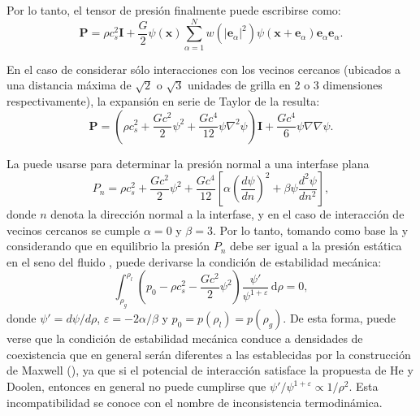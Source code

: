 Por lo tanto, el tensor de presi\'on finalmente puede escribirse como:
\begin{equation}
	\bm{P} = \rho c_s^2 \bm{I} + \dfrac{G}{2}\psi(\bm{x}) \sum_{\alpha=1}^N w(|\bm{e}_{\alpha}|^2)\psi(\bm{x}+\bm{e}_{\alpha})\bm{e}_{\alpha}\bm{e}_{\alpha}.
	\label{eq:ptens_shan}
\end{equation}

En el caso de considerar s\'olo interacciones con los vecinos cercanos (ubicados a una distancia m\'axima de $\sqrt{2}$ o $\sqrt{3}$ unidades de grilla en 2 o 3 dimensiones respectivamente), la expansi\'on en serie de Taylor de la  resulta:
\begin{equation}
	\bm{P} = \left( \rho c_s^2 + \dfrac{G c^2}{2} \psi^2 + \dfrac{G c^4}{12} \psi \nabla^2 \psi \right) \bm{I} + \dfrac{G c^4}{6} \psi \nabla \nabla \psi.
	\label{eq:ptens_shan_taylor}	
\end{equation}

La  puede usarse para determinar la presi\'on normal a una interfase plana
\begin{equation}
	P_n = \rho c_s^2 + \dfrac{G c^2}{2} \psi^2 + \dfrac{G c^4}{12} \left[ \alpha \left( \dfrac{d\psi}{dn} \right)^2 + \beta \psi \dfrac{d^2 \psi}{dn^2} \right],
	\label{eq:ptens_shan_plane}	
\end{equation}
donde $n$ denota la direcci\'on normal a la interfase, y en el caso de interacci\'on de vecinos cercanos se cumple $\alpha = 0$ y $\beta = 3$. Por lo tanto, tomando como base la  y considerando que en equilibrio la presi\'on $P_n$ debe ser igual a la presi\'on est\'atica en el seno del fluido \cite{shan_pressure_2008}, puede derivarse la condici\'on de estabilidad mec\'anica:
\begin{equation}
	\int_{\rho_g}^{\rho_l} \left( p_0 - \rho c_s^2 - \dfrac{Gc^2}{2} \psi^2 \right) \dfrac{\psi'}{\psi^{1+\varepsilon}} \, \mbox{d}\rho = 0,
\end{equation}
donde $\psi' = d\psi / d\rho$, $\varepsilon=-2\alpha/\beta$ y $p_0=p(\rho_l)=p(\rho_g)$. De esta forma, puede verse que la condici\'on de estabilidad mec\'anica conduce a densidades de coexistencia que en general ser\'an diferentes a las establecidas por la construcci\'on de Maxwell (), ya que si el potencial de interacci\'on satisface la propuesta de He y Doolen, entonces en general no puede cumplirse que $\psi' / \psi^{1+\varepsilon} \propto 1/\rho^2$. Esta incompatibilidad se conoce con el nombre de inconsistencia termodin\'amica.


